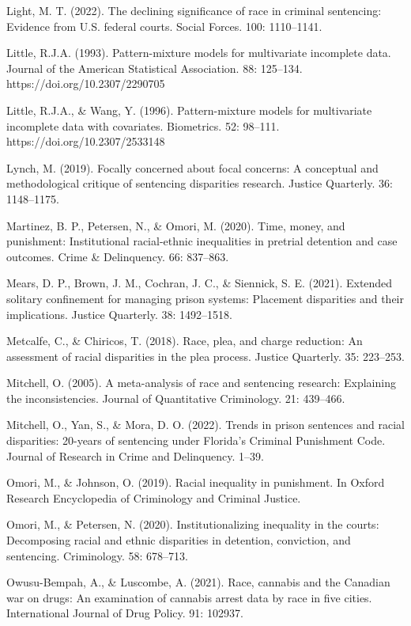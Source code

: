 \documentclass[titlepage]{article}
\begin{document}
Light, M. T. (2022). The declining significance of race in criminal sentencing: Evidence from U.S. federal courts. Social Forces. 100: 1110--1141.

Little, R.J.A. (1993). Pattern-mixture models for multivariate incomplete data. Journal of the American Statistical Association. 88: 125–134. https://doi.org/10.2307/2290705 

Little, R.J.A., \& Wang, Y. (1996). Pattern-mixture models for multivariate incomplete data with covariates. Biometrics. 52: 98--111. https://doi.org/10.2307/2533148

Lynch, M. (2019). Focally concerned about focal concerns: A conceptual and methodological critique of sentencing disparities research. Justice Quarterly. 36: 1148--1175.

Martinez, B. P., Petersen, N., \& Omori, M. (2020). Time, money, and punishment: Institutional racial-ethnic inequalities in pretrial detention and case outcomes. Crime \& Delinquency. 66: 837--863.

Mears, D. P., Brown, J. M., Cochran, J. C., \& Siennick, S. E. (2021). Extended solitary confinement for managing prison systems: Placement disparities and their implications. Justice Quarterly. 38: 1492--1518.

Metcalfe, C., \& Chiricos, T. (2018). Race, plea, and charge reduction: An assessment of racial disparities in the plea process. Justice Quarterly. 35: 223--253.

Mitchell, O. (2005). A meta-analysis of race and sentencing research: Explaining the inconsistencies. Journal of Quantitative Criminology. 21: 439--466.

Mitchell, O., Yan, S., \& Mora, D. O. (2022). Trends in prison sentences and racial disparities: 20-years of sentencing under Florida’s Criminal Punishment Code. Journal of Research in Crime and Delinquency. 1--39.

Omori, M., \& Johnson, O. (2019). Racial inequality in punishment. In Oxford Research Encyclopedia of Criminology and Criminal Justice.

Omori, M., \& Petersen, N. (2020). Institutionalizing inequality in the courts: Decomposing racial and ethnic disparities in detention, conviction, and sentencing. Criminology. 58: 678--713.

Owusu-Bempah, A., \& Luscombe, A. (2021). Race, cannabis and the Canadian war on drugs: An examination of cannabis arrest data by race in five cities. International Journal of Drug Policy. 91: 102937.
\end{document}
